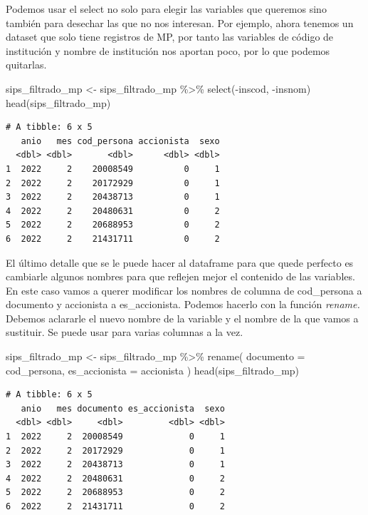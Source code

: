 \documentclass[
  letterpaper,
  DIV=11,
  numbers=noendperiod]{scrreprt}
\newenvironment{Shaded}{\begin{snugshade}}{\end{snugshade}}
\newcommand{\AttributeTok}[1]{\textcolor[rgb]{0.40,0.45,0.13}{#1}}
\newcommand{\FunctionTok}[1]{\textcolor[rgb]{0.28,0.35,0.67}{#1}}
\newcommand{\NormalTok}[1]{\textcolor[rgb]{0.00,0.23,0.31}{#1}}
\newcommand{\OtherTok}[1]{\textcolor[rgb]{0.00,0.23,0.31}{#1}}
\newcommand{\SpecialCharTok}[1]{\textcolor[rgb]{0.37,0.37,0.37}{#1}}
\begin{document}
Podemos usar el select no solo para elegir las variables que queremos
sino también para desechar las que no nos interesan. Por ejemplo, ahora
tenemos un dataset que solo tiene registros de MP, por tanto las
variables de código de institución y nombre de institución nos aportan
poco, por lo que podemos quitarlas.

\begin{Shaded}
\begin{Highlighting}[]
\NormalTok{sips\_filtrado\_mp }\OtherTok{\textless{}{-}}\NormalTok{ sips\_filtrado\_mp }\SpecialCharTok{\%\textgreater{}\%} \FunctionTok{select}\NormalTok{(}\SpecialCharTok{{-}}\NormalTok{inscod, }\SpecialCharTok{{-}}\NormalTok{insnom)}
\FunctionTok{head}\NormalTok{(sips\_filtrado\_mp)}
\end{Highlighting}
\end{Shaded}

\begin{verbatim}
# A tibble: 6 x 5
   anio   mes cod_persona accionista  sexo
  <dbl> <dbl>       <dbl>      <dbl> <dbl>
1  2022     2    20008549          0     1
2  2022     2    20172929          0     1
3  2022     2    20438713          0     1
4  2022     2    20480631          0     2
5  2022     2    20688953          0     2
6  2022     2    21431711          0     2
\end{verbatim}

El último detalle que se le puede hacer al dataframe para que quede
perfecto es cambiarle algunos nombres para que reflejen mejor el
contenido de las variables. En este caso vamos a querer modificar los
nombres de columna de cod\_persona a documento y accionista a
es\_accionista. Podemos hacerlo con la función \emph{rename.} Debemos
aclararle el nuevo nombre de la variable y el nombre de la que vamos a
sustituir. Se puede usar para varias columnas a la vez.

\begin{Shaded}
\begin{Highlighting}[]
\NormalTok{sips\_filtrado\_mp }\OtherTok{\textless{}{-}}\NormalTok{ sips\_filtrado\_mp }\SpecialCharTok{\%\textgreater{}\%} 
  \FunctionTok{rename}\NormalTok{(}
    \AttributeTok{documento =}\NormalTok{ cod\_persona,}
    \AttributeTok{es\_accionista =}\NormalTok{ accionista}
\NormalTok{  )}
\FunctionTok{head}\NormalTok{(sips\_filtrado\_mp)}
\end{Highlighting}
\end{Shaded}

\begin{verbatim}
# A tibble: 6 x 5
   anio   mes documento es_accionista  sexo
  <dbl> <dbl>     <dbl>         <dbl> <dbl>
1  2022     2  20008549             0     1
2  2022     2  20172929             0     1
3  2022     2  20438713             0     1
4  2022     2  20480631             0     2
5  2022     2  20688953             0     2
6  2022     2  21431711             0     2
\end{verbatim}
\end{document}
